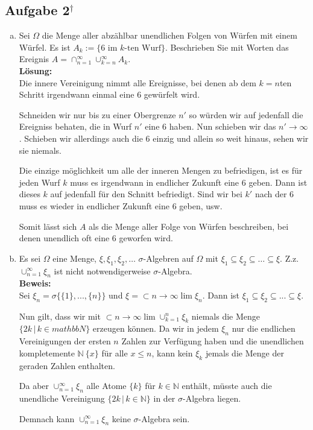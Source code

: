 \documentclass[11pt,a4paper,ngerman]{article}
\newcommand{\set}[1]{ \{ #1 \}}
\begin{document}
\subsection*{Aufgabe 2$^\dagger$}
\begin{enumerate}[a)]
\item Sei $\Omega$ die Menge aller abzählbar unendlichen Folgen von Würfen mit einem Würfel. Es ist $A_k := \set{\text{6 im $k$-ten Wurf}}$. Beschrieben
Sie mit Worten das Ereignis $A = \cap_{n=1}^\infty \cup_{k=n}^\infty A_k$.\\

\textbf{Lösung:}\\

Die innere Vereinigung nimmt alle Ereignisse, bei denen ab dem $k=n$ten
Schritt irgendwann einmal eine $6$ gewürfelt wird.

Schneiden wir nur bis zu einer Obergrenze $n'$ so würden wir auf jedenfall
die Ereigniss behaten, die in Wurf $n'$ eine $6$ haben. Nun schieben
wir das $n' \rightarrow \infty$. Schieben wir allerdings auch die $6$ einzig und
allein so weit hinaus, sehen wir sie niemals.

Die einzige möglichkeit um alle der inneren Mengen zu befriedigen, ist
es für jeden Wurf $k$ muss es irgendwann in endlicher Zukunft eine $6$ geben.
Dann ist dieses $k$ auf jedenfall für den Schnitt befriedigt. Sind wir bei $k'$ nach der $6$ muss es wieder in endlicher Zukunft eine $6$ geben, usw.

Somit lässt sich $A$ als die Menge aller Folge von Würfen beschreiben, bei denen
unendlich oft eine $6$ geworfen wird.

\item Es sei $\Omega$ eine Menge, $\xi, \xi_1, \xi_2,\ldots$ $\sigma$-Algebren auf $\Omega$ mit $\xi_1 \subseteq \xi_2 \subseteq \ldots \subseteq \xi$.
Z.z. $\cup_{n=1}^\infty \xi_n$ ist nicht notwendigerweise $\sigma$-Algebra.\\

\textbf{Beweis:}\\

Sei $\xi_n = \sigma \{ \{1\} , ... , \{n\}\}$ und $\xi = \subset{n\rightarrow \infty}{\lim} \xi_n$.
Dann ist $\xi_1 \subseteq \xi_2 \subseteq ... \subseteq \xi$.

Nun gilt, dass wir mit $\subset{n\rightarrow\infty}{\lim}\cup_{k=1}^n \xi_k$
niemals die Menge $\{2k \, | \, k \in mathbb{N}\}$ erzeugen können.
Da wir in jedem $\xi_n$ nur die endlichen Vereinigungen der ersten $n$ Zahlen
zur Verfügung haben und die unendlichen kompletemente $\mathbb{N} \ \{x\}$ für alle $x \leq n$, kann kein $\xi_k$ jemals die Menge der geraden Zahlen enthalten.

Da aber $\cup_{n=1}^\infty \xi_n$ alle Atome $\{k\}$ für $k\in \mathbb{N}$ 
enthält, müsste auch die unendliche Vereinigung $\{2k \, | \, k \in \mathbb{N}\}$ in der $\sigma$-Algebra liegen.

Demnach kann $\cup_{n=1}^\infty \xi_n$ keine $\sigma$-Algebra sein.

\end{enumerate}
\end{document}
